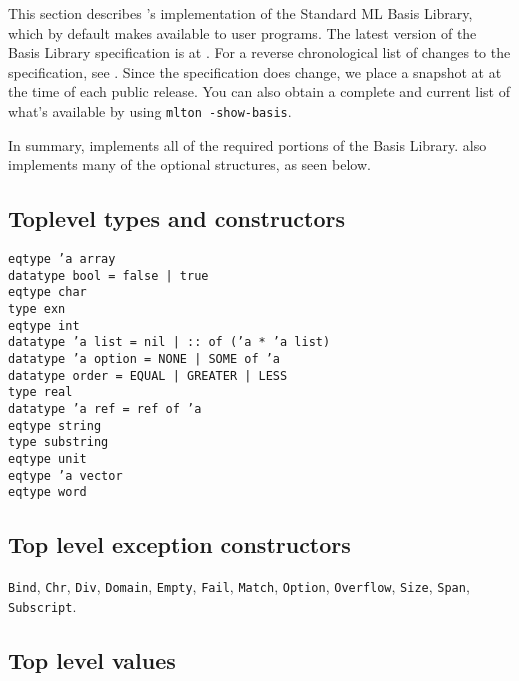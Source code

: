 %
This section describes {\mlton}'s implementation of the Standard ML
Basis Library, which by default {\mlton} makes available to user
programs.  The latest version of the Basis Library specification is at
.  For a reverse chronological
list of changes to the specification, see
.  Since the
specification does change, we place a snapshot at
 at the time of each {\mlton} public release.
You can also obtain a complete and current list of what's available by
using {\tt mlton -show-basis}.

In summary, {\mlton} implements all of the required portions of the
Basis Library.  {\mlton} also implements many of the optional
structures, as seen below.
%
\subsection{Toplevel types and constructors}
{
\tt eqtype 'a array\\
\tt datatype bool = false | true\\
\tt eqtype char\\
\tt type exn\\
\tt eqtype int\\
\tt datatype 'a list = nil | :: of ('a * 'a list)\\
\tt datatype 'a option = NONE | SOME of 'a\\
\tt datatype order = EQUAL | GREATER | LESS\\
\tt type real\\
\tt datatype 'a ref = ref of 'a\\
\tt eqtype string\\
\tt type substring\\
\tt eqtype unit\\
\tt eqtype 'a vector\\
\tt eqtype word\\
}
%
\subsection{Top level exception constructors}
{\tt Bind},
{\tt Chr},
{\tt Div},
{\tt Domain},
{\tt Empty},
{\tt Fail},
{\tt Match},
{\tt Option},
{\tt Overflow},
{\tt Size},
{\tt Span},
{\tt Subscript}.
%
\subsection{Top level values}


